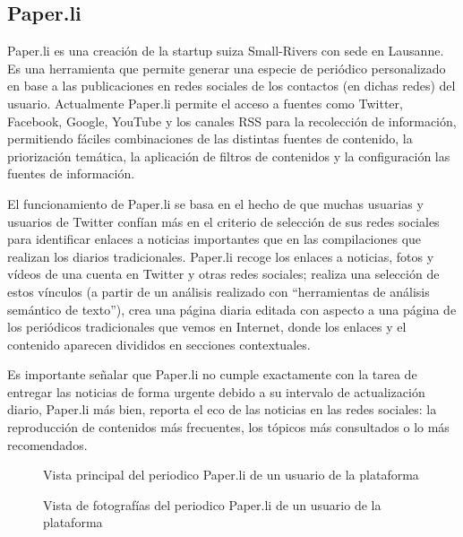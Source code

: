 \subsection{Paper.li}\label{subsec:paperli}

Paper.li \cite{paperli} es una creación de la startup suiza Small-Rivers con sede en Lausanne. Es una herramienta que permite generar una especie de periódico personalizado en base a las publicaciones en redes sociales de los contactos (en dichas redes) del usuario. Actualmente Paper.li permite el acceso a fuentes como Twitter, Facebook, Google, YouTube y los canales RSS para la recolección de información, permitiendo fáciles combinaciones de las distintas fuentes de contenido, la priorización temática, la aplicación de filtros de contenidos y la configuración las fuentes de información.

El funcionamiento de Paper.li se basa en el hecho de que muchas usuarias y usuarios de Twitter confían más en el criterio de selección de sus redes sociales para identificar enlaces a noticias importantes que en las compilaciones que realizan los diarios tradicionales. Paper.li recoge los enlaces a noticias, fotos y vídeos de una cuenta en Twitter y otras redes sociales;  realiza una selección de estos vínculos (a partir de un análisis realizado con “herramientas de análisis semántico de texto”), crea una página diaria editada con aspecto a una página de los periódicos tradicionales que vemos en Internet, donde los enlaces y el contenido aparecen divididos en secciones contextuales.

Es importante señalar que Paper.li no cumple exactamente con la tarea de entregar las noticias de forma urgente debido a su intervalo de actualización diario, Paper.li más bien, reporta el eco de las noticias en las redes sociales: la reproducción de contenidos más frecuentes, los tópicos más consultados o lo más recomendados.

\begin{figure}[H]
	\centering
	\begin{minipage}[t]{.45\textwidth}
		\begin{center}
			\caption{Vista principal del periodico Paper.li de un usuario de la plataforma}
			\label{fig:paperli1}
		\end{center}
	\end{minipage}
	\hfill
	\begin{minipage}[t]{.45\textwidth}
		\begin{center}
			\caption{Vista de fotografías del periodico Paper.li de un usuario de la plataforma}
			\label{fig:paperli2}
		\end{center}
	\end{minipage}
	\hfill
\end{figure}


